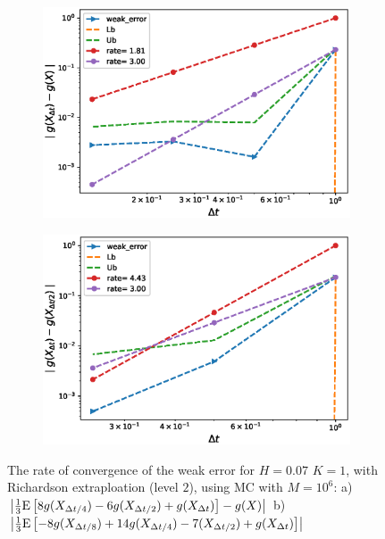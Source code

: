 \documentclass[11pt]{article}
\newcommand{\expt}[1]{\mathrm{E}\left[#1\right]}
\begin{document}
\begin{figure}[h!]
	\centering
	\begin{subfigure}{.4\textwidth}
		\centering
		\includegraphics[width=1\linewidth]{./figures/rBergomi_weak_error_rates/with_richardson/H_007/weak_convergence_order_Bergomi_H_007_K_1_richardson_level2_relative_M_10_6}
		\caption{}
		\label{fig:sub3}
	\end{subfigure}%
	\begin{subfigure}{.4\textwidth}
		\centering
		\includegraphics[width=1\linewidth]{./figures/rBergomi_weak_error_rates/with_richardson/H_007/weak_convergence_order_differences_Bergomi_H_007_K_1_richardson_level2_relative_M_10_6}
		\caption{}
		\label{fig:sub4}
	\end{subfigure}
	
	\caption{The rate of convergence of the weak error for $H=0.07$ $K=1$, with Richardson extraploation (level $2$), using MC with $M=10^6$: a) $\abs{\frac{1}{3}\expt{8 g(X_{\Delta t/4}) -6g(X_{\Delta t/2}) +g(X_{\Delta t})}-g(X)}$  b) $\abs{\frac{1}{3}\expt{-8 g(X_{\Delta t/8}) +14g(X_{\Delta t/4})-7 (X_{\Delta t/2}) +g(X_{\Delta t})}}$} 
	\label{fig:Weak_rate_H_007_with_rich_level2}
\end{figure}
\end{document}
